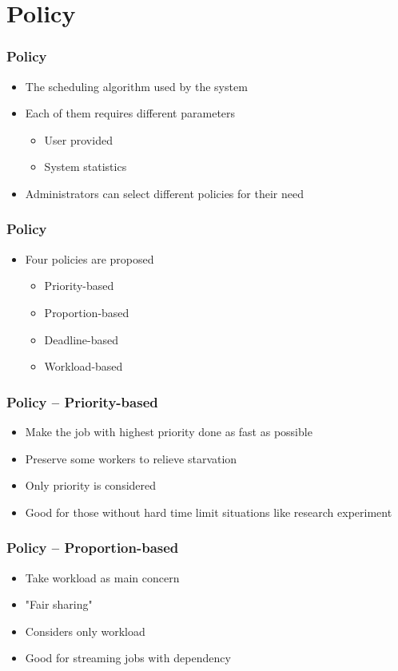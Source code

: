 \documentclass{beamer}
\begin{document}
\section{Policy}
\begin{frame}
  \frametitle{Policy}
  \begin{itemize}
    \item The scheduling algorithm used by the system
    \item Each of them requires different parameters
      \begin{itemize}
        \item User provided
        \item System statistics
      \end{itemize}
    \item Administrators can select different policies for their need
  \end{itemize}
\end{frame}
\begin{frame}
  \frametitle{Policy}
  \begin{itemize}
    \item Four policies are proposed
      \begin{itemize}
        \item Priority-based
        \item Proportion-based
        \item Deadline-based
        \item Workload-based
      \end{itemize}
  \end{itemize}
\end{frame}
\begin{frame}
  \frametitle{Policy -- Priority-based}
  \begin{itemize}
    \item Make the job with highest priority done as fast as possible
    \item Preserve some workers to relieve starvation
    \item Only priority is considered
    \item Good for those without hard time limit situations like research experiment
  \end{itemize}
\end{frame}
\begin{frame}
  \frametitle{Policy -- Proportion-based}
  \begin{itemize}
    \item Take workload as main concern
    \item "Fair sharing"
    \item Considers only workload
    \item Good for streaming jobs with dependency
  \end{itemize}
\end{frame}
\end{document}
